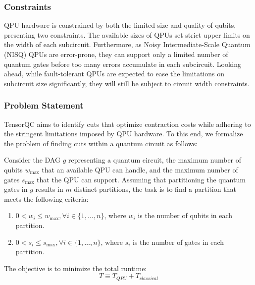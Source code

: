 \subsubsection{Constraints}
QPU hardware is constrained by both the limited size and quality of qubits,
presenting two constraints.
The available sizes of QPUs set strict upper limits on the width of each subcircuit.
Furthermore, as Noisy Intermediate-Scale Quantum (NISQ) QPUs are error-prone,
they can support only a limited number of quantum gates before too many errors accumulate in each subcircuit.
Looking ahead, while fault-tolerant QPUs are expected to ease the limitations on subcircuit size significantly,
they will still be subject to circuit width constraints.

\subsubsection{Problem Statement}
TensorQC aims to identify cuts that optimize contraction costs while adhering to the stringent limitations imposed by QPU hardware.
To this end, we formalize the problem of finding cuts within a quantum circuit as follows:

Consider the DAG $g$ representing a quantum circuit,
the maximum number of qubits $w_{\max}$ that an available QPU can handle,
and the maximum number of gates $s_{\max}$ that the QPU can support.
Assuming that partitioning the quantum gates in $g$ results in $m$ distinct partitions,
the task is to find a partition that meets the following criteria:
\begin{enumerate}
    \item $0<w_i\leq w_{\max}, \forall i\in \{1,\ldots,n\}$, where $w_i$ is the number of qubits in each partition.
    \item $0<s_i\leq s_{\max}, \forall i\in \{1,\ldots,n\}$, where $s_i$ is the number of gates in each partition.
\end{enumerate}
The objective is to minimize the total runtime:
\begin{equation}
    T\equiv T_{QPU} + T_{classical}\label{eq:cut_objective}
\end{equation}
